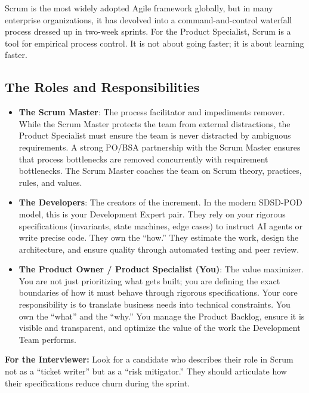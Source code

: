 \documentclass[
  11pt,
  openany,
  oneside]{book}
\providecommand{\tightlist}{%
  \setlength{\itemsep}{0pt}\setlength{\parskip}{0pt}}
\renewenvironment{quote}{\begin{customquote}}{\end{customquote}}
\begin{document}
Scrum is the most widely adopted Agile framework globally, but in many
enterprise organizations, it has devolved into a command-and-control
waterfall process dressed up in two-week sprints. For the Product
Specialist, Scrum is a tool for empirical process control. It is not
about going faster; it is about learning faster.

\subsection{The Roles and
Responsibilities}\label{the-roles-and-responsibilities}

\begin{itemize}
\tightlist
\item
  \textbf{The Scrum Master}: The process facilitator and impediments
  remover. While the Scrum Master protects the team from external
  distractions, the Product Specialist must ensure the team is never
  distracted by ambiguous requirements. A strong PO/BSA partnership with
  the Scrum Master ensures that process bottlenecks are removed
  concurrently with requirement bottlenecks. The Scrum Master coaches
  the team on Scrum theory, practices, rules, and values.
\item
  \textbf{The Developers}: The creators of the increment. In the modern
  SDSD-POD model, this is your Development Expert pair. They rely on
  your rigorous specifications (invariants, state machines, edge cases)
  to instruct AI agents or write precise code. They own the ``how.''
  They estimate the work, design the architecture, and ensure quality
  through automated testing and peer review.
\item
  \textbf{The Product Owner / Product Specialist (You)}: The value
  maximizer. You are not just prioritizing what gets built; you are
  defining the exact boundaries of how it must behave through rigorous
  specifications. Your core responsibility is to translate business
  needs into technical constraints. You own the ``what'' and the
  ``why.'' You manage the Product Backlog, ensure it is visible and
  transparent, and optimize the value of the work the Development Team
  performs.
\end{itemize}

\begin{quote}
\textbf{For the Interviewer:} Look for a candidate who describes their
role in Scrum not as a ``ticket writer'' but as a ``risk mitigator.''
They should articulate how their specifications reduce churn during the
sprint.
\end{quote}
\end{document}
